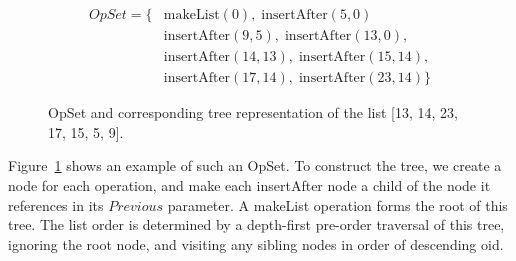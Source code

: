 \begin{figure}
\centering
\begin{minipage}{8cm}
\begin{align*}
\mathit{OpSet} = \{ &
    \mathrm{makeList}(0),\; \mathrm{insertAfter}(5, 0) \\ &
    \mathrm{insertAfter}(9, 5),\; \mathrm{insertAfter}(13, 0), \\&
    \mathrm{insertAfter}(14, 13),\; \mathrm{insertAfter}(15, 14), \\&
    \mathrm{insertAfter}(17, 14),\; \mathrm{insertAfter}(23, 14) \}
\end{align*}
\end{minipage}
\hspace{20pt}
\begin{minipage}{6cm}
\end{minipage}
\caption{OpSet and corresponding tree representation of the list [13, 14, 23, 17, 15, 5, 9].}\label{fig:list-tree}
\end{figure}

Figure~\ref{fig:list-tree} shows an example of such an OpSet.
To construct the tree, we create a node for each operation, and make each insertAfter node a child of the node it references in its $\mathit{Previous}$ parameter.
A makeList operation forms the root of this tree.
The list order is determined by a depth-first pre-order traversal of this tree, ignoring the root node, and visiting any sibling nodes in order of descending oid.

